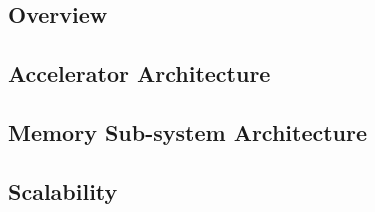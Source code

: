 \subsection{Overview}
\label{sec:overview}



\vspace{-0.1in}
\subsection{Accelerator Architecture}
\vspace{-0.1in}
\label{sec:processing}


\subsection{Memory Sub-system Architecture}
\vspace{-0.1in}
\label{sec:memory}

\vspace{-0.1in}

\subsection{Scalability}
\vspace{-0.1in}
\label{sec:scale}

\vspace{-0.1in}
